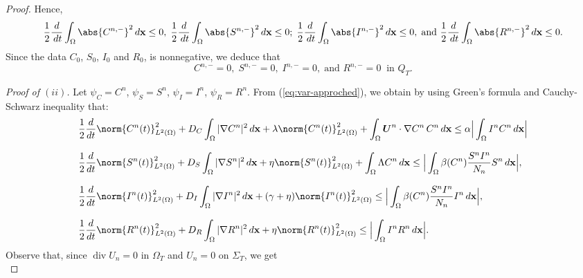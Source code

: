 \documentclass[10pt,number,preprint,times]{elsarticle}
\numberwithin{equation}{section} %
\begin{document}
\begin{proof}
		\noindent
		Hence, 
		$$\displaystyle\frac{1}{2}\frac{d}{\,dt}\int_\Omega \abs{C^{n,-}}^2  \, d\mathbf{x} \leq 0,\; \displaystyle\frac{1}{2}\frac{d}{\,dt}\int_\Omega \abs{S^{n,-}}^2  \, d\mathbf{x} \leq 0;\; \displaystyle\frac{1}{2}\frac{d}{\,dt}\int_\Omega \abs{I^{n,-}}^2  \, d\mathbf{x} \leq 0, \; \text{and } \displaystyle\frac{1}{2}\frac{d}{\,dt}\int_\Omega \abs{R^{n,-}}^2  \, d\mathbf{x} \leq 0.$$
		Since the data $C_0$, $S_0$, $I_0$ and $R_0$, is nonnegative, we deduce that $$C^{n,-}=0,\;  S^{n,-}=0,\; I^{n,-}=0,\; \text{and } R^{n,-}=0 \; \; \text{in } Q_T.$$
	
		
		\textit{Proof of $(ii)$.}  
		Let $\psi_C=C^n$, $\psi_S=S^n$, $\psi_I=I^n$, $\psi_R=R^n$. From (\ref {eq:var-approched}), we obtain by using Green's formula and Cauchy-Schwarz inequality that:
		\begin{equation}\label{est-fluid1}
			\begin{array}{l}
				\displaystyle	\frac{1}{2} \frac{d}{dt}\norm{C^n(t)}_{L^2(\Omega)}^2 +D_C    \int_\Omega | \nabla C^n|^2 \, d\mathbf{x}  +\lambda \norm{C^n(t)}_{L^2(\Omega)}^2 +  \int_{\Omega} \boldsymbol{U}^n\cdot \nabla C^n \, C^n  \, d\mathbf{x}  
				\leq
				\alpha \Big|\int_{\Omega} I^n C^n  \, d\mathbf{x}\Big| \\ \\
				\displaystyle	\frac{1}{2} \frac{d}{dt}\norm{S^n(t)}_{L^2(\Omega)}^2 +D_S    \int_\Omega | \nabla S^n|^2 \, d\mathbf{x} +\eta \norm{S^n(t)}_{L^2(\Omega)}^2 +  \int_{\Omega} \Lambda C^n  \, d\mathbf{x}  
				\leq 
				\Big| \int_{\Omega} \beta(C^n) \frac{S^n I^n }{N_n} S^n\, d\mathbf{x} \Big|,\\ \\
				\displaystyle	\frac{1}{2} \frac{d}{dt}\norm{I^n(t)}_{L^2(\Omega)}^2 +D_I    \int_\Omega | \nabla I^n|^2 \, d\mathbf{x}  +(\gamma+\eta) \norm{I^n(t)}_{L^2(\Omega)}^2  \leq \Big| \int_{\Omega} \beta(C^n) \frac{S^n I^n }{N_n}I^n \, d\mathbf{x} \Big|,\\ \\
				\displaystyle	\frac{1}{2} \frac{d}{dt}\norm{R^n(t)}_{L^2(\Omega)}^2 +D_R    \int_\Omega | \nabla R^n|^2 \, d\mathbf{x}  +\eta \norm{R^n(t)}_{L^2(\Omega)}^2  \leq \Big| \int_{\Omega}  I^n R^n \, d\mathbf{x} \Big|.
			\end{array}
		\end{equation}
		Observe that, since $\operatorname{div} U_n=0$ in $\Omega_T$ and $U_n=0$ on $\Sigma_T$, we get
		\begin{equation}\label{galc}

\end{equation}
\end{proof}
\end{document}
